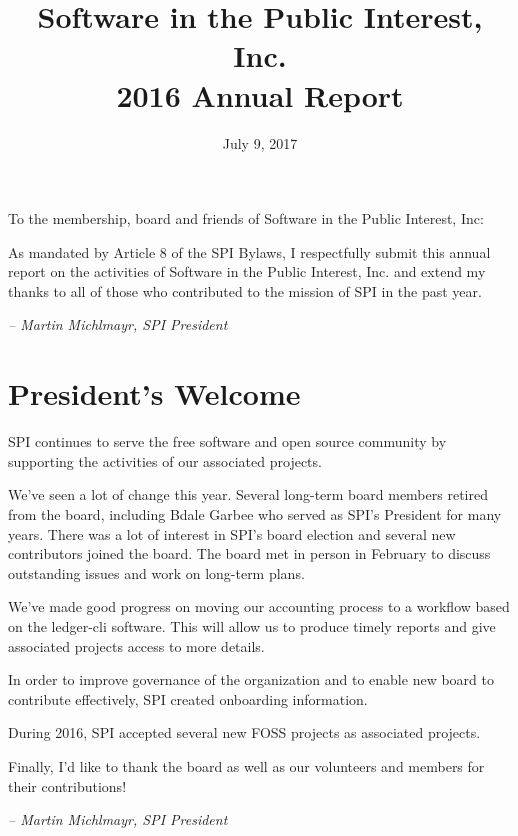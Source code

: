 \documentclass[letterpaper]{report}
\begin{document}
\title{Software in the Public Interest, Inc.\\
2016 Annual Report}
\date{July 9, 2017}

\maketitle

To the membership, board and friends of Software in the Public Interest, Inc:

As mandated by Article 8 of the SPI Bylaws, I respectfully submit this annual
report on the activities of Software in the Public Interest, Inc. and extend my
thanks to all of those who contributed to the mission of SPI in the past year.

  \emph{-- Martin Michlmayr, SPI President}

\newpage

\tableofcontents

\newpage

\chapter{President's Welcome}
\label{sec:president}

SPI continues to serve the free software and open source community by
supporting the activities of our associated projects.

We've seen a lot of change this year.  Several long-term board members
retired from the board, including Bdale Garbee who served as SPI's
President for many years.  There was a lot of interest in SPI's board
election and several new contributors joined the board.  The board met
in person in February to discuss outstanding issues and work on
long-term plans.

We've made good progress on moving our accounting process to a workflow
based on the ledger-cli software.  This will allow us to produce timely
reports and give associated projects access to more details.

In order to improve governance of the organization and to enable new board
to contribute effectively, SPI created onboarding information.

During 2016, SPI accepted several new FOSS projects as associated
projects.

Finally, I'd like to thank the board as well as our volunteers and
members for their contributions!

  \emph{-- Martin Michlmayr, SPI President}
\end{document}
